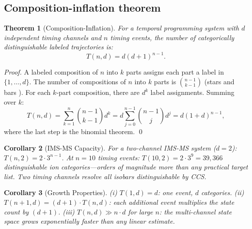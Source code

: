 \documentclass[twocolumn,10pt,a4paper]{article}
\theoremstyle{thmstyle}
\newtheorem{theorem}{Theorem}[section]
\newtheorem{corollary}[theorem]{Corollary}
\theoremstyle{definition}
\theoremstyle{remark}
\begin{document}
\subsection{Composition-inflation theorem}

\begin{theorem}[Composition-Inflation]
\label{thm:inflation}
For a temporal programming system with $d$ independent timing channels
and $n$ timing events, the number of categorically distinguishable
labeled trajectories is:
\begin{equation}
T(n, d) = d(d+1)^{n-1}.
\label{eq:inflation}
\end{equation}
\end{theorem}

\begin{proof}
A labeled composition of $n$ into $k$ parts assigns each part a label
in $\{1,\ldots,d\}$. The number of compositions of $n$ into $k$ parts
is $\binom{n-1}{k-1}$ (stars and bars \citep{andrews1976}).
For each $k$-part composition, there are $d^k$ label assignments.
Summing over $k$:
\[
T(n,d) = \sum_{k=1}^{n}\binom{n-1}{k-1}d^k
= d\sum_{j=0}^{n-1}\binom{n-1}{j}d^j = d(1+d)^{n-1},
\]
where the last step is the binomial theorem. \qed
\end{proof}

\begin{corollary}[IMS-MS Capacity]
For a two-channel IMS-MS system ($d = 2$):
$T(n, 2) = 2 \cdot 3^{n-1}$.
At $n = 10$ timing events: $T(10, 2) = 2 \cdot 3^9 = 39{,}366$
distinguishable ion categories---orders of magnitude more than any
practical target list. Two timing channels resolve all isobars
distinguishable by CCS.
\end{corollary}

\begin{corollary}[Growth Properties]
(i) $T(1,d) = d$: one event, $d$ categories.
(ii) $T(n+1, d) = (d+1) \cdot T(n,d)$: each additional event multiplies
the state count by $(d+1)$.
(iii) $T(n,d) \gg n \cdot d$ for large $n$: the multi-channel state space
grows exponentially faster than any linear estimate.
\end{corollary}
\end{document}
